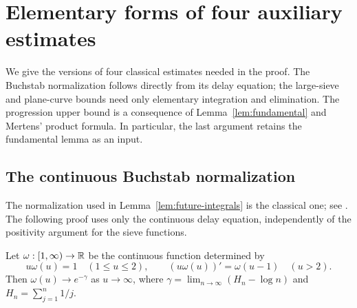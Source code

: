 \section{Elementary forms of four auxiliary estimates}
\label{sec:elementary-inputs}

We give the versions of four classical estimates needed in the proof.
The Buchstab normalization follows directly from its delay equation;
the large-sieve and plane-curve bounds need only elementary integration
and elimination.  The progression upper bound is a consequence of
Lemma~\ref{lem:fundamental} and Mertens' product formula.  In particular,
the last argument retains the fundamental lemma as an input.

\subsection{The continuous Buchstab normalization}

The normalization used in Lemma~\ref{lem:future-integrals} is the
classical one; see \cite[Section~28.9, p.~236]{MontgomeryVaughanIII}.  The following
proof uses only the continuous delay equation, independently of the
positivity argument for the sieve functions.

\begin{lemma}\label{lem:elementary-buchstab}
Let $\omega:[1,\infty)\to\mathbb R$ be the continuous function determined by
\[
 u\omega(u)=1\quad(1\le u\le2),\qquad
 (u\omega(u))'=\omega(u-1)\quad(u>2).
\]
Then $\omega(u)\to e^{-\gamma}$ as $u\to\infty$, where
$\gamma=\lim_{n\to\infty}(H_n-\log n)$ and
$H_n=\sum_{j=1}^n1/j$.
\end{lemma}

